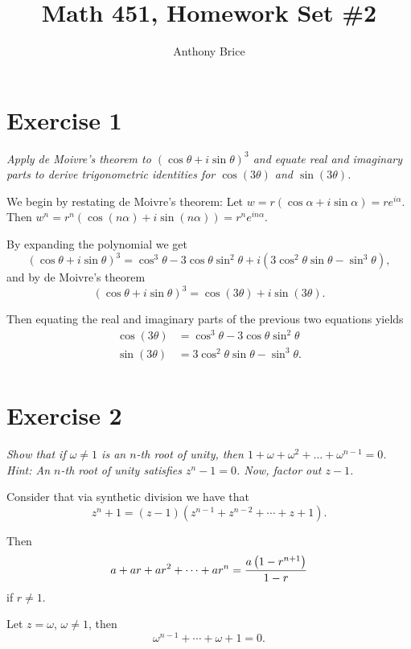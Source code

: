 \documentclass{tufte-handout}
\title{Math 451, Homework Set \#2}
\author{Anthony Brice}
\begin{document}
\maketitle

\section{Exercise 1}

\textit{Apply de Moivre's theorem to
  ${(\cos \theta + i \sin \theta)}^3$ and equate real and imaginary
  parts to derive trigonometric identities for $\cos(3\theta)$ and
  $\sin(3\theta)$.}

\bigskip

We begin by restating de Moivre's theorem: Let
$w = r( \cos \alpha + i \sin \alpha) = re^{i \alpha}$. Then
$w^n = r^n (\cos( n \alpha) + i \sin( n \alpha)) = r^n e^{ i n
  \alpha}$.

By expanding the polynomial we get%
\[ {(\cos \theta + i \sin \theta)}^3 = \cos^3 \theta - 3 \cos \theta
\sin^2 \theta + i (3 \cos^2 \theta \sin \theta - \sin^3 \theta),\]
and by de Moivre's theorem%
\[{(\cos \theta + i \sin \theta)}^3 = \cos( 3 \theta ) + i \sin( 3
\theta ).\]

Then equating the real and imaginary parts of the previous two
equations yields%
\begin{align*}
  \cos ( 3 \theta) &= \cos^3 \theta - 3 \cos \theta \sin^2 \theta\\
  \sin( 3 \theta) &= 3 \cos^2 \theta \sin \theta - \sin^3 \theta.\\
\end{align*}

\section{Exercise 2}

\textit{Show that if $\omega \neq 1$ is an $n$-th root of unity, then
  $1 + \omega + \omega^2 + \dots + \omega^{n - 1} = 0$. Hint: An
  $n$-th root of unity satisfies $z^n - 1 = 0$. Now, factor out $z -
  1$.}

\bigskip

Consider that via synthetic division we have that%
\[ z^n + 1 = (z - 1)\left( z^{n - 1} + z^{n - 2} + \cdots + z + 1 \right) .\]

Then%
\[ a + ar + ar^2 + \cdots + ar^n = {a \left(1 - r^{n + 1}\right) \over 1 - r} \]
if $r \neq 1$.

Let $z = \omega$, $\omega \neq 1$, then%
\[ \omega^{n - 1} + \cdots + \omega + 1 = 0. \]
\end{document}
